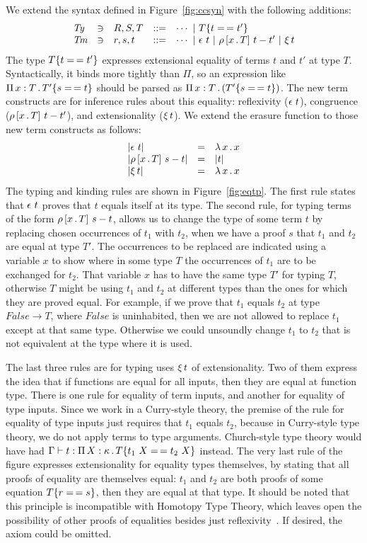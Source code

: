 \documentclass{article}
\begin{document}
We extend the syntax defined in Figure~\ref{fig:ccsyn} with the following additions:
\[
\begin{array}{lllll}
  \textit{Ty} & \ni & R,S,T & ::= & \cdots\ |\ \eqtm{t}{T}{t'} \\
  \textit{Tm} & \ni & r,s,t & ::= & \cdots\ |\ \rfl{t}\ |\ \cng{x}{T}{t}{t'}\ |\ \ext{t}
\end{array}
\]
\noindent The type $\eqtm{t}{T}{t'}$ expresses extensional equality of
terms $t$ and $t'$ at type $T$.  Syntactically, it binds more tightly
than $\Pi$, so an expression like $\Pia{x}{T}{\eqtm{s}{T'}{t}}$ should
be parsed as $\Pia{x}{T}{(\eqtm{s}{T'}{t})}$.  The new term constructs
are for inference rules about this equality: reflexivity ($\rfl{t}$),
congruence ($\cng{x}{T}{t}{t'}$), and extensionality ($\ext{t}$).  We
extend the erasure function to those new term constructs as follows:
\[
\begin{array}{lll}
  |\rfl{t}| & = & \lam{x}{x} \\
  |\cng{x}{T}{s}{t}| & = & |t| \\
  |\ext{t}| & = & \lam{x}{x}
\end{array}
\]
\noindent The typing and kinding rules are shown in
Figure~\ref{fig:eqtp}.  The first rule states that $\rfl{t}$ proves
that $t$ equals itself at its type.  The second rule, for typing
terms of the form $\cng{x}{T}{s}{t}$, allows us
to change the type of some term $t$ by replacing chosen occurrences
of $t_1$ with $t_2$, when we have a proof $s$ that $t_1$ and $t_2$
are equal at type $T'$.  The occurrences to be replaced are indicated
using a variable $x$ to show where in some type $T$ the occurrences
of $t_1$ are to be exchanged for $t_2$.  That variable $x$ has to
have the same type $T'$ for typing $T$, otherwise $T$ might be using
$t_1$ and $t_2$ at different types than the ones for which they are
proved equal.  For example, if we prove that $t_1$ equals $t_2$ at type
$\textit{False} \to T$, where $\textit{False}$ is uninhabited, then
we are not allowed to replace $t_1$ except at that same type.  Otherwise
we could unsoundly change $t_1$ to $t_2$ that is not equivalent at the
type where it is used.

The last three rules are for typing uses $\ext{t}$ of extensionality.
Two of them express the idea that if functions are equal for all
inputs, then they are equal at function type.  There is one rule for
equality of term inputs, and another for equality of type inputs.
Since we work in a Curry-style theory, the premise of the rule for
equality of type inputs just requires that $t_1$ equals $t_2$, because
in Curry-style type theory, we do not apply terms to type arguments.
Church-style type theory would have had $\Gamma \vdash t :
\Pia{X}{\kappa}{\eqtm{t_1\ X}{T}{t_2\ X}}$ instead.  The very last
rule of the figure expresses extensionality for equality types
themselves, by stating that all proofs of equality are themselves
equal: $t_1$ and $t_2$ are both proofs of some equation
$\eqtm{r}{T}{s}$, then they are equal at that type.  It should be
noted that this principle is incompatible with Homotopy Type Theory,
which leaves open the possibility of other proofs of equalities
besides just reflexivity~\cite{hottbook}.  If desired, the axiom could
be omitted.
\end{document}
